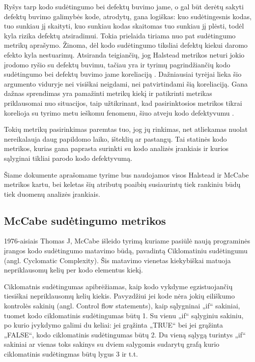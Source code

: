 \documentclass{VUMIFPSbakalaurinis}
\begin{document}
Ryšys tarp kodo sudėtingumo bei defektų buvimo jame, o gal būt derėtų sakyti defektų buvimo galimybės kode, atrodytų, gana logiškas: kuo sudėtingesnis kodas, tuo sunkiau jį skaityti, kuo sunkiau kodas skaitomas tuo sunkiau jį plėsti, todėl kyla rizika defektų atsiradimui. Tokia prielaida tiriama nuo pat sudėtingumo metrikų aprašymo. Žinoma, dėl kodo sudėtingumo tiksliai defektų kiekui daromo efekto kyla nestuarimų. Atsiranda teigiančių, jog Halstead metrikos neturi jokio įrodomo ryšio su defektų buvimu, tačiau yra ir tyrimų pagrindžiančių kodo sudėtingumo bei defektų buvimo jame koreliaciją \cite{Schroeder1999APG}. Dažniausiai tyrėjai lieka šio argumento viduryje nei visiškai neigdami, nei patvirtindami šią koreliaciją. Gana dažnas sprendimas yra pamažinti metrikų kiekį ir patikrinti metrikas priklausomai nuo situacijos, taip užtikrinant, kad pasirinktosios metrikos tikrai korelioja su tyrimo metu ieškomu fenomenu, šiuo atveju kodo defektyvumu \cite{Metrics in Evaluating Software Defects:2013}.

Tokių metrikų pasirinkimas paremtas tuo, jog jų rinkimas, net atliekamas nuolat nereikalauja daug papildomo laiko, išteklių ar pastangų. Tai statinės kodo metrikos, kurias gana paprasta surinkti su kodo analizės įrankiais ir kurios sąlyginai tikliai parodo kodo defektyvumą.

Šiame dokumente aprašomame tyrime bus naudojamos visos Halstead ir McCabe metrikos kartu, bei keletas šių atributų poaibių susiaurintų tiek rankiniu būdų tiek duomenų analizės įrankiais.

\subsection{McCabe sudėtingumo metrikos}
1976-aisiais Thomas J, McCabe išleido tyrimą kuriame pasiūlė naują programinės įrangos kodo sudėtingumo matavimo būdą, pavadintą Ciklomatiniu sudėtingumu (angl. Cyclomatic Complexity). Šis matavimo vienetas kiekybiškai matuoja nepriklausomų kelių per kodo elementus kiekį.

Ciklomatnis sudėtingumas apibrėžiamas, kaip kodo vykdyme egzistuojančių tiesiškai nepriklausomų kelių kiekis. Pavyzdžiui jei kode nėra jokių eiliškumo kontrolės sakinių (angl. Control flow statements), kaip sąlygninai „if“ sakiniai, tuomet kodo ciklomatinis sudėtingumas būtų 1. Su vienu „if“ sąlyginiu sakiniu, po kurio įvykdymo galimi du keliai: jei grąžinta „TRUE“ bei jei grąžinta „FALSE“, kodo ciklomatinis sudėtingumas būtų 2. Du vieną sąlygą turintys „if“ sakiniai ar vienas toks sakinys su dviem salygomis sudarytų grafą kurio ciklomatinis sudėtingmas būtų lygus 3 ir t.t. \cite{McCabe:1976:CM:800253.807712}
\end{document}
